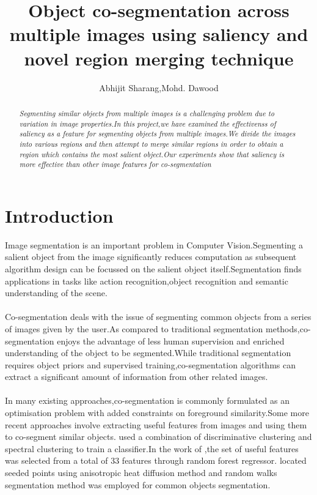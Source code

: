 \documentclass{article}
\title{Object co-segmentation across multiple images using saliency and novel region merging technique}
\author{Abhijit Sharang,Mohd. Dawood}
\date{}
\begin{document}
\maketitle
\begin{abstract}
\emph{Segmenting similar objects from multiple images is a challenging problem due to variation in image properties.In this project,we have examined the effectivenss of saliency as a feature for segmenting objects from multiple images.We divide the images into various regions and then attempt to merge similar regions in order to obtain a region which contains the most salient object.Our experiments show that saliency is more effective than other image features for co-segmentation}
\end{abstract}
\section{Introduction}
Image segmentation is an important problem in Computer Vision.Segmenting a salient object from the image significantly reduces computation as subsequent algorithm design can be focussed on the salient object itself.Segmentation finds applications in tasks like action recognition,object recognition and semantic understanding of the scene.\\\\
Co-segmentation deals with the issue of segmenting common objects from a series of images given by the user.As compared to traditional segmentation methods,co-segmentation enjoys the advantage of less human supervision and enriched understanding of the object to be segmented.While traditional segmentation requires object priors and supervised training,co-segmentation algorithms can extract a significant amount of information from other related images.\\\\
In many existing approaches,co-segmentation is commonly formulated as an optimisation problem with added constraints on foreground similarity\cite{conf/cvpr/RotherMBK06}\cite{conf/cvpr/MukherjeeSD09}\cite{Hochbaum:2001:EAI:502090.502093}.Some more recent approaches involve extracting useful features from images and using them to co-segment similar objects.\cite{conf/cvpr/JoulinBP10} used a combination of discriminative clustering and spectral clustering to train a classifier.In the work of \cite{Vicente:2011:OC:2191740.2191840},the set of useful features was selected from a total of 33 features through random forest regressor.\cite{GunheeKim:2011:DCV:2355573.2356257} located seeded points using anisotropic heat diffusion method and random walks segmentation method was employed for common objects segmentation.\\\\
\end{document}
